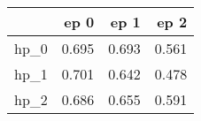 \begin{tabular}{lrrr}
\toprule
{} &   ep 0 &   ep 1 &   ep 2 \\
\midrule
hp\_0 &  0.695 &  0.693 &  0.561 \\
hp\_1 &  0.701 &  0.642 &  0.478 \\
hp\_2 &  0.686 &  0.655 &  0.591 \\
\bottomrule
\end{tabular}
